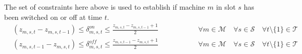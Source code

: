 \documentclass{article}
\newcommand{\cT}{{\mathcal T}}
\newcommand{\cM}{{\mathcal M}}
\newcommand{\cP}{{\mathcal P}}
\newcommand{\cF}{{\mathcal F}}
\newcommand{\cS}{{\mathcal S}}
\begin{document}
{\begin{comment} 	
		\begin{align}
		& (f_{m,s,t} - f_{m,s,t-1}) \leq \hat{f}_{m}^{RU,lim} & \hspace{5cm} \forall m \in \cF \quad \forall s \in \cS \quad \forall t \setminus\{1\} \in \cT \label{eq:RUlim_f}\\
		& (f_{m,s,t-1} - f_{m,s,t}) \leq \hat{f}_{m}^{RD,lim} & \hspace{5cm} \forall m \in \cF \quad \forall s \in \cS \quad \forall t \setminus\{1\} \in \cT \label{eq:RDlim_f}\\
		& (el_{m,s,t}^{cons} - el_{m,s,t-1}^{cons}) \leq \hat{el}_{m}^{RU,lim} & \hspace{5cm} \forall m \in \cP^- \quad \forall s \in \cS \quad \forall t \setminus\{1\} \in \cT \label{eq:RUlim_el}\\
		& (el_{m,s,t-1}^{cons} - el_{m,s,t}^{cons}) \leq \hat{el}_{m}^{RD,lim} & \hspace{5cm} \forall m \in \cP^- \quad \forall s \in \cS \quad \forall t \setminus\{1\} \in \cT \label{eq:RDlim_el}
		\end{align}	
\end{comment}
The set of constraints here above is used to establish if machine $m$ in slot $s$ has been switched on or off at time $t$. 
		\begin{align}
		& (z_{m,s,t}-z_{m,s,t-1}) \leq \delta_{m,s,t}^{on} \leq \frac{z_{m,s,t}-z_{m,s,t-1} +1}{2} & \hspace{2cm} \forall m \in \cM \quad \forall s \in \cS \quad \forall t \setminus\{1\} \in \cT \label{eq:DeltaOn}\\
		& (z_{m,s,t-1}-z_{m,s,t}) \leq \delta_{m,s,t}^{off} \leq \frac{z_{m,s,t-1}-z_{m,s,t} +1}{2} & \hspace{2cm} \forall m \in \cM \quad \forall s \in \cS \quad \forall t \setminus\{1\} \in \cT \label{eq:DeltaOff}
		\end{align}		 	
\begin{comment}		
		\begin{align}
		& \Delta_{m,s,t}^{on} \geq (z_{m,s,t} - z_{m,s,t-1}) & \hspace{5cm} \forall m \in \cM \quad \forall s \in \cS \quad \forall t \setminus\{1\} \in \cT \label{eq:DeltaOn_1}\\
		& \Delta_{m,s,t}^{on} \leq (1 - z_{m,s,t-1}) & \hspace{5cm} \forall m \in \cM \quad \forall s \in \cS \quad \forall t \setminus\{1\} \in \cT \label{eq:DeltaOn_2}\\

\end{comment}}
\end{document}
